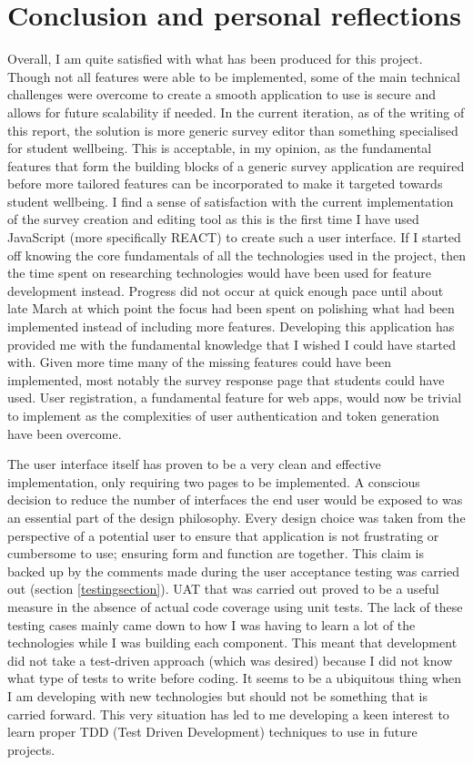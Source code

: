 \section{Conclusion and personal reflections}

Overall, I am quite satisfied with what has been produced for this project.
Though not all features were able to be implemented, some of the main technical challenges were overcome to create a smooth application 
to use is secure and allows for future scalability if needed.
In the current iteration, as of the writing of this report, the solution is more generic survey editor than something specialised for student wellbeing.
This is acceptable, in my opinion, as the fundamental features that form the building blocks of a generic survey application are required 
before more tailored features can be incorporated to make it targeted towards student wellbeing.
I find a sense of satisfaction with the current implementation of the survey creation and editing tool as this is the first time I have used JavaScript
(more specifically REACT) to create such a user interface.  
If I started off knowing the core fundamentals of all the technologies used in the project, then the time spent on researching technologies would have
been used for feature development instead.
Progress did not occur at quick enough pace until about late March at which point the focus had been spent on polishing what had been implemented instead of including more features. 
Developing this application has provided me with the fundamental knowledge that I wished I could have started with.
Given more time many of the missing features could have been implemented, most notably the survey response page that students could have used.
User registration, a fundamental feature for web apps, would now be trivial to implement as the complexities of user authentication and token 
generation have been overcome.

The user interface itself has proven to be a very clean and effective implementation, only requiring two pages to be implemented.
A conscious decision to reduce the number of interfaces the end user would be exposed to was an essential part of the design philosophy.
Every design choice was taken from the perspective of a potential user to ensure that application is not frustrating or cumbersome to use; ensuring 
form and function are together.
This claim is backed up by the comments made during the user acceptance testing was carried out (section \ref{testingsection}).
UAT that was carried out proved to be a useful measure in the absence of actual code coverage using unit tests.
The lack of these testing cases mainly came down to how I was having to learn a lot of the technologies while I was building each component.
This meant that development did not take a test-driven approach (which was desired) because I did not know what type of tests to write before coding.
It seems to be a ubiquitous thing when I am developing with new technologies but should not be something that is carried forward.
This very situation has led to me developing a keen interest to learn proper TDD (Test Driven Development) techniques to use in future projects. 

